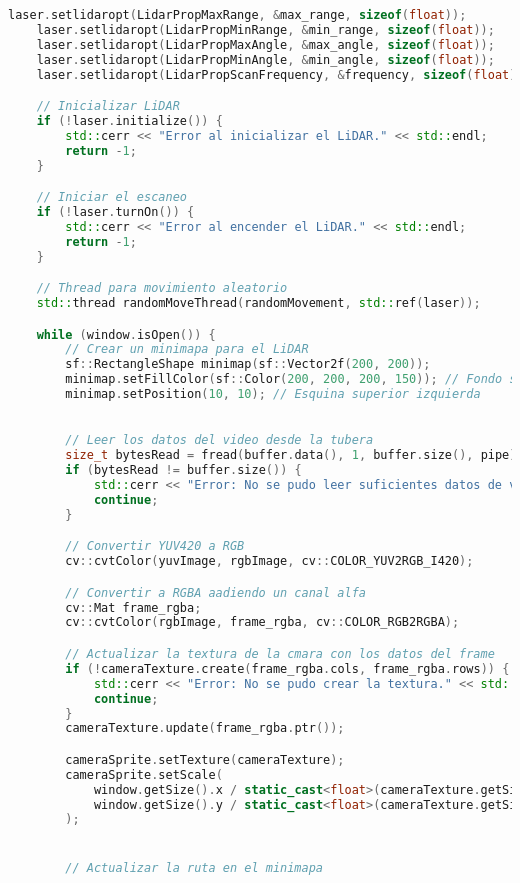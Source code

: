 \begin{lstlisting}[language={C++}, caption={Cuarto ajuste de c\'odigo}, label={CuartoAjuste}]
    laser.setlidaropt(LidarPropMaxRange, &max_range, sizeof(float));
    laser.setlidaropt(LidarPropMinRange, &min_range, sizeof(float));
    laser.setlidaropt(LidarPropMaxAngle, &max_angle, sizeof(float));
    laser.setlidaropt(LidarPropMinAngle, &min_angle, sizeof(float));
    laser.setlidaropt(LidarPropScanFrequency, &frequency, sizeof(float));

    // Inicializar LiDAR
    if (!laser.initialize()) {
        std::cerr << "Error al inicializar el LiDAR." << std::endl;
        return -1;
    }

    // Iniciar el escaneo
    if (!laser.turnOn()) {
        std::cerr << "Error al encender el LiDAR." << std::endl;
        return -1;
    }

    // Thread para movimiento aleatorio
    std::thread randomMoveThread(randomMovement, std::ref(laser));

    while (window.isOpen()) {
        // Crear un minimapa para el LiDAR
        sf::RectangleShape minimap(sf::Vector2f(200, 200));
        minimap.setFillColor(sf::Color(200, 200, 200, 150)); // Fondo semitransparente
        minimap.setPosition(10, 10); // Esquina superior izquierda
        

        // Leer los datos del video desde la tubera
        size_t bytesRead = fread(buffer.data(), 1, buffer.size(), pipe);
        if (bytesRead != buffer.size()) {
            std::cerr << "Error: No se pudo leer suficientes datos de video." << std::endl;
            continue;
        }

        // Convertir YUV420 a RGB
        cv::cvtColor(yuvImage, rgbImage, cv::COLOR_YUV2RGB_I420);

        // Convertir a RGBA aadiendo un canal alfa
        cv::Mat frame_rgba;
        cv::cvtColor(rgbImage, frame_rgba, cv::COLOR_RGB2RGBA);

        // Actualizar la textura de la cmara con los datos del frame
        if (!cameraTexture.create(frame_rgba.cols, frame_rgba.rows)) {
            std::cerr << "Error: No se pudo crear la textura." << std::endl;
            continue;
        }
        cameraTexture.update(frame_rgba.ptr());

        cameraSprite.setTexture(cameraTexture);
        cameraSprite.setScale(
            window.getSize().x / static_cast<float>(cameraTexture.getSize().x),
            window.getSize().y / static_cast<float>(cameraTexture.getSize().y)
        );


        // Actualizar la ruta en el minimapa
        

\end{lstlisting}
